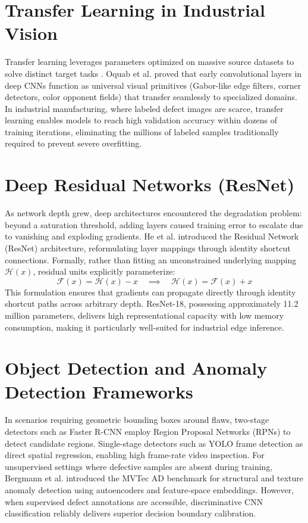 \documentclass[12pt,a4paper]{report}
\begin{document}
\section{Transfer Learning in Industrial Vision}
Transfer learning leverages parameters optimized on massive source datasets to solve distinct target tasks \cite{oquab2014learning}. Oquab et al. proved that early convolutional layers in deep CNNs function as universal visual primitives (Gabor-like edge filters, corner detectors, color opponent fields) that transfer seamlessly to specialized domains. In industrial manufacturing, where labeled defect images are scarce, transfer learning enables models to reach high validation accuracy within dozens of training iterations, eliminating the millions of labeled samples traditionally required to prevent severe overfitting.

\section{Deep Residual Networks (ResNet)}
As network depth grew, deep architectures encountered the degradation problem: beyond a saturation threshold, adding layers caused training error to escalate due to vanishing and exploding gradients. He et al. \cite{he2016deep} introduced the Residual Network (ResNet) architecture, reformulating layer mappings through identity shortcut connections. Formally, rather than fitting an unconstrained underlying mapping $\mathcal{H}(x)$, residual units explicitly parameterize:
\begin{equation}
    \mathcal{F}(x) = \mathcal{H}(x) - x \quad \implies \quad \mathcal{H}(x) = \mathcal{F}(x) + x
\end{equation}
This formulation ensures that gradients can propagate directly through identity shortcut paths across arbitrary depth. ResNet-18, possessing approximately 11.2 million parameters, delivers high representational capacity with low memory consumption, making it particularly well-suited for industrial edge inference.

\section{Object Detection and Anomaly Detection Frameworks}
In scenarios requiring geometric bounding boxes around flaws, two-stage detectors such as Faster R-CNN \cite{ren2017faster} employ Region Proposal Networks (RPNs) to detect candidate regions. Single-stage detectors such as YOLO \cite{redmon2018yolov3} frame detection as direct spatial regression, enabling high frame-rate video inspection. For unsupervised settings where defective samples are absent during training, Bergmann et al. \cite{bergmann2019mvtec} introduced the MVTec AD benchmark for structural and texture anomaly detection using autoencoders and feature-space embeddings. However, when supervised defect annotations are accessible, discriminative CNN classification reliably delivers superior decision boundary calibration.
\end{document}
